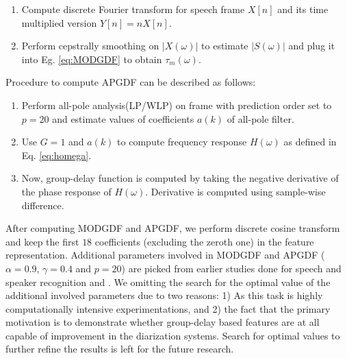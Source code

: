 \documentclass[conference]{IEEEtran}
\begin{document}
\begin{enumerate}
\item Compute discrete Fourier transform for speech frame $X[n]$ and its time multiplied version $Y[n]=nX[n]$.
\item Perform cepstrally smoothing on $|X(\omega)|$ to estimate $|S(\omega)|$ and plug it into Eg. \ref{eq:MODGDF} to obtain $\tau_{m}(\omega)$.
\end{enumerate}	
\vspace{0.2cm}
Procedure to compute APGDF can be described as follows:
\begin{enumerate}
\item Perform all-pole analysis(LP/WLP) on frame with prediction order set to $p=20$ and estimate values of coefficients $a(k)$ of all-pole filter.  
\item Use $G=1$ and $a(k)$ to compute frequency response $H(\omega)$ as defined in Eq. \ref{eq:homega}.
\item Now, group-delay function is computed by taking the negative derivative of the phase response of $H(\omega)$. Derivative is computed using sample-wise difference.
\end{enumerate}	
\vspace{0.2cm}
After computing MODGDF and APGDF, we perform discrete cosine transform and keep the first $18$ coefficients (excluding the zeroth one) in the feature representation. Additional parameters involved in MODGDF and APGDF ($\alpha = 0.9$, $\gamma=0.4$ and $p=20$) are picked from earlier studies done for speech and speaker recognition \cite{modifiedGD} and \cite{allPoleGdSid}. We omitting the search for the optimal value of the additional involved parameters due to two reasons: 1) As this task is highly computationally intensive experimentations, and 2) the fact that the primary motivation is to demonstrate whether group-delay based features are at all capable of improvement in the diarization systems. Search for optimal values to further refine the results is left for the future research.
\end{document}
